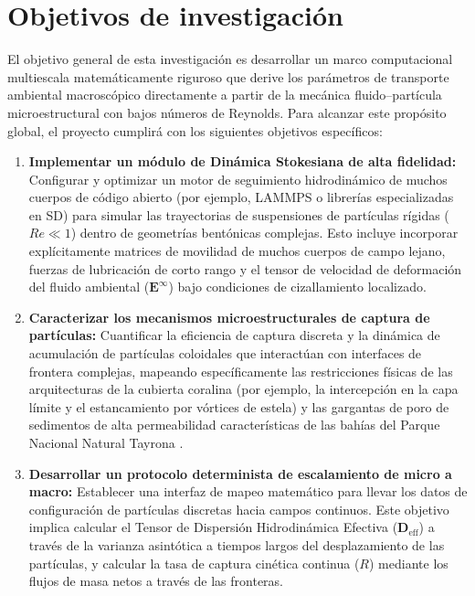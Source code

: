 \section{Objetivos de investigación}
\label{sec:objectives}

El objetivo general de esta investigación es desarrollar un marco computacional multiescala matemáticamente riguroso que derive los parámetros de transporte ambiental macroscópico directamente a partir de la mecánica fluido--partícula microestructural con bajos números de Reynolds. Para alcanzar este propósito global, el proyecto cumplirá con los siguientes objetivos específicos:

\begin{enumerate}
    \item \textbf{Implementar un módulo de Dinámica Stokesiana de alta fidelidad:} Configurar y optimizar un motor de seguimiento hidrodinámico de muchos cuerpos de código abierto (por ejemplo, LAMMPS o librerías especializadas en SD) para simular las trayectorias de suspensiones de partículas rígidas ($Re \ll 1$) dentro de geometrías bentónicas complejas. Esto incluye incorporar explícitamente matrices de movilidad de muchos cuerpos de campo lejano, fuerzas de lubricación de corto rango y el tensor de velocidad de deformación del fluido ambiental ($\bm{{E}}^{\infty}$) bajo condiciones de cizallamiento localizado.
    \item \textbf{Caracterizar los mecanismos microestructurales de captura de partículas:} Cuantificar la eficiencia de captura discreta y la dinámica de acumulación de partículas coloidales que interactúan con interfaces de frontera complejas, mapeando específicamente las restricciones físicas de las arquitecturas de la cubierta coralina (por ejemplo, la intercepción en la capa límite y el estancamiento por vórtices de estela) y las gargantas de poro de sedimentos de alta permeabilidad características de las bahías del Parque Nacional Natural Tayrona \cite{goldman1967shear, monismith2007hydrodynamics, sen2010lightdriven}.
    \item \textbf{Desarrollar un protocolo determinista de escalamiento de micro a macro:} Establecer una interfaz de mapeo matemático para llevar los datos de configuración de partículas discretas hacia campos continuos. Este objetivo implica calcular el Tensor de Dispersión Hidrodinámica Efectiva ($\bm{D}_{\text{eff}}$) a través de la varianza asintótica a tiempos largos del desplazamiento de las partículas, y calcular la tasa de captura cinética continua ($R$) mediante los flujos de masa netos a través de las fronteras.

\end{enumerate}
